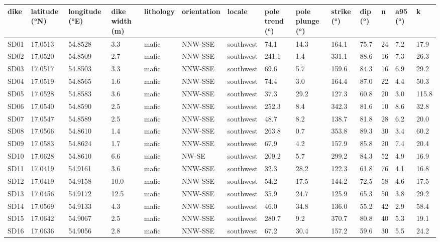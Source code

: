 \footnotesize
\begin{tabular}{llllllllllllll}
\toprule
dike & latitude (°N) & longitude (°E) & dike width (m) & lithology & orientation & locale & pole trend (°) & pole plunge (°) & strike (°) & dip (°) & n & a95 (°) & k \\
\midrule
SD01 & 17.0513 & 54.8528 & 3.3 & mafic & NNW-SSE & southwest & 74.1 & 14.3 & 164.1 & 75.7 & 24 & 7.2 & 17.9 \\
SD02 & 17.0520 & 54.8509 & 2.7 & mafic & NNW-SSE & southwest & 241.1 & 1.4 & 331.1 & 88.6 & 16 & 7.3 & 26.3 \\
SD03 & 17.0517 & 54.8503 & 3.3 & mafic & NNW-SSE & southwest & 69.6 & 5.7 & 159.6 & 84.3 & 16 & 6.9 & 29.2 \\
SD04 & 17.0519 & 54.8565 & 1.6 & mafic & NNW-SSE & southwest & 74.4 & 3.0 & 164.4 & 87.0 & 22 & 4.4 & 50.3 \\
SD05 & 17.0528 & 54.8583 & 3.6 & mafic & NNW-SSE & southwest & 37.3 & 29.2 & 127.3 & 60.8 & 20 & 3.0 & 115.8 \\
SD06 & 17.0540 & 54.8590 & 2.5 & mafic & NNW-SSE & southwest & 252.3 & 8.4 & 342.3 & 81.6 & 10 & 8.6 & 32.8 \\
SD07 & 17.0547 & 54.8589 & 2.5 & mafic & NNW-SSE & southwest & 48.7 & 8.2 & 138.7 & 81.8 & 28 & 6.2 & 20.0 \\
SD08 & 17.0566 & 54.8610 & 1.4 & mafic & NNW-SSE & southwest & 263.8 & 0.7 & 353.8 & 89.3 & 30 & 3.4 & 60.2 \\
SD09 & 17.0583 & 54.8624 & 1.7 & mafic & NNW-SSE & southwest & 67.9 & 4.2 & 157.9 & 85.8 & 20 & 7.4 & 20.4 \\
SD10 & 17.0628 & 54.8610 & 6.6 & mafic & NW-SE & southwest & 209.2 & 5.7 & 299.2 & 84.3 & 52 & 4.9 & 16.9 \\
SD11 & 17.0419 & 54.9161 & 3.6 & mafic & NNW-SSE & southwest & 32.3 & 28.2 & 122.3 & 61.8 & 76 & 4.1 & 16.8 \\
SD12 & 17.0419 & 54.9158 & 10.0 & mafic & NNW-SSE & southwest & 54.2 & 17.5 & 144.2 & 72.5 & 58 & 4.6 & 17.5 \\
SD13 & 17.0456 & 54.9172 & 12.5 & mafic & NNW-SSE & southwest & 35.9 & 24.7 & 125.9 & 65.3 & 50 & 3.8 & 29.2 \\
SD14 & 17.0569 & 54.9133 & 4.3 & mafic & NNW-SSE & southwest & 46.0 & 34.8 & 136.0 & 55.2 & 42 & 2.9 & 58.4 \\
SD15 & 17.0642 & 54.9067 & 2.5 & mafic & NNW-SSE & southwest & 280.7 & 9.2 & 370.7 & 80.8 & 40 & 5.3 & 19.1 \\
SD16 & 17.0636 & 54.9056 & 2.8 & mafic & NNW-SSE & southwest & 67.2 & 30.4 & 157.2 & 59.6 & 30 & 5.5 & 24.2 \\

\end{tabular}
